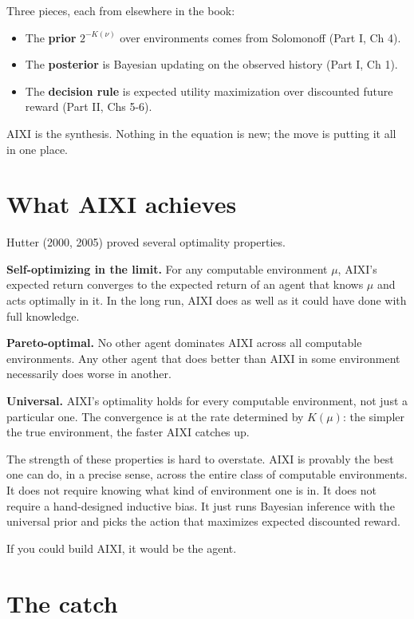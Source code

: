 Three pieces, each from elsewhere in the book:

\begin{itemize}
\item The \textbf{prior} $2^{-K(\nu)}$ over environments comes from Solomonoff (Part I, Ch 4).
\item The \textbf{posterior} is Bayesian updating on the observed history (Part I, Ch 1).
\item The \textbf{decision rule} is expected utility maximization over discounted future reward (Part II, Chs 5-6).
\end{itemize}

AIXI is the synthesis. Nothing in the equation is new; the move is putting it all in one place.

\section*{What AIXI achieves}

Hutter (2000, 2005) proved several optimality properties.

\textbf{Self-optimizing in the limit.} For any computable environment $\mu$, AIXI's expected return converges to the expected return of an agent that knows $\mu$ and acts optimally in it. In the long run, AIXI does as well as it could have done with full knowledge.

\textbf{Pareto-optimal.} No other agent dominates AIXI across all computable environments. Any other agent that does better than AIXI in some environment necessarily does worse in another.

\textbf{Universal.} AIXI's optimality holds for every computable environment, not just a particular one. The convergence is at the rate determined by $K(\mu)$: the simpler the true environment, the faster AIXI catches up.

The strength of these properties is hard to overstate. AIXI is provably the best one can do, in a precise sense, across the entire class of computable environments. It does not require knowing what kind of environment one is in. It does not require a hand-designed inductive bias. It just runs Bayesian inference with the universal prior and picks the action that maximizes expected discounted reward.

If you could build AIXI, it would be the agent.

\section*{The catch}

